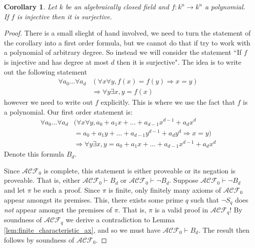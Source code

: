 \documentclass[12pt]{article}
\theoremstyle{plain}
\newtheorem{cor}[thm]{Corollary}
\theoremstyle{definition}
\newcommand{\call}[1]{\mathcal{#1}}
\newcommand{\lto}{\longrightarrow}
\begin{document}
	\begin{cor}
		Let $k$ be an algebraically closed field and $f: k^n \lto k^n$ a polynomial. If $f$ is injective then it is surjective.
		\end{cor}
	\begin{proof}
		There is a small slieght of hand involved, we need to turn the statement of the corollary into a first order formula, but we cannot do that if try to work with a polynomial of arbitrary degree. So instead we will consider the statement ``If $f$ is injective and has degree at most $d$ then it is surjective". The idea is to write out the following statement
		\begin{align}
			\forall a_0\ldots \forall a_{d}&(\forall x \forall y, f(x) = f(y) \Rightarrow x = y)\\
			&\Longrightarrow \forall y \exists x, y = f(x)
		\end{align}
	however we need to write out $f$ explicitly. This is where we use the fact that $f$ is a polynomial. Our first order statement is:
		\begin{align*}
			\forall a_0\ldots \forall a_{d}&(\forall x \forall y, a_0 + a_1 x + \ldots + a_{d-1}x^{d-1} + a_dx^d\\
			&= a_0 + a_1 y + \ldots + a_{d-1}y^{d-1} + a_dy^d \Rightarrow x = y)\\
			&\Longrightarrow \forall y \exists x, y = a_0 + a_1 x + \ldots + a_{d-1}x^{d-1} + a_dx^d
			\end{align*}
		Denote this formula $B_d$.
		
		Since $\call{ACF}_0$ is complete, this statement is either proveable or its negation is proveable. That is, either $\call{ACF}_0 \vdash B_d$ or $\call{ACF}_0 \vdash \neg B_d$. Suppose $\call{ACF}_0 \vdash \neg B_d$ and let $\pi$ be such a proof. Since $\pi$ is finite, only finitely many axioms of $\call{ACF}_0$ appear amongst its premises. This, there exists some prime $q$ such that $\neg S_q$ does \emph{not} appear amongst the premises of $\pi$. That is, $\pi$ is a valid proof in $\call{ACF}_q$! By soundness of $\call{ACF}_q$ we derive a contradiction to Lemma \ref{lem:finite_characteristic_ax}, and so we must have $\call{ACF}_0 \vdash B_d$. The result then follows by soundness of $\call{ACF}_0$.
		\end{proof}
	
\end{document}
